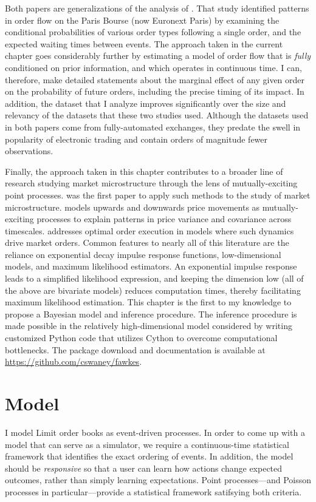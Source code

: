 		Both papers are generalizations of the analysis of \cite{Biais1995}. That study identified patterns in order flow on the Paris Bourse (now Euronext Paris) by examining the conditional probabilities of various order types following a single order, and the expected waiting times between events. The approach taken in the current chapter goes considerably further by estimating a model of order flow that is \textit{fully} conditioned on prior information, and which operates in continuous time. I can, therefore, make detailed statements about the marginal effect of any given order on the probability of future orders, including the precise timing of its impact. In addition, the dataset that I analyze improves significantly over the size and relevancy of the datasets that these two studies used. Although the datasets used in both papers come from fully-automated exchanges, they predate the swell in popularity of electronic trading and contain orders of magnitude fewer observations.

		Finally, the approach taken in this chapter contributes to a broader line of research studying market microstructure through the lens of mutually-exciting point processes. \cite{Bowsher2007} was the first paper to apply such methods to the study of market microstructure. \cite{Bacry2013} models upwards and downwards price movements as mutually-exciting processes to explain patterns in price variance and covariance across timescales. \cite{Alfonsi2016} addresses optimal order execution in models where such dynamics drive market orders. Common features to nearly all of this literature are the reliance on exponential decay impulse response functions, low-dimensional models, and maximum likelihood estimators. An exponential impulse response leads to a simplified likelihood expression, and keeping the dimension low (all of the above are bivariate models) reduces computation times, thereby facilitating maximum likelihood estimation. This chapter is the first to my knowledge to propose a Bayesian model and inference procedure. The inference procedure is made possible in the relatively high-dimensional model considered by writing customized Python code that utilizes Cython to overcome computational bottlenecks. The package download and documentation is available at \url{https://github.com/cswaney/fawkes}.


\section{Model}
	I model Limit order books as event-driven processes. In order to come up with a model that can serve as a simulator, we require a continuous-time statistical framework that identifies the exact ordering of events. In addition, the model should be \textit{responsive} so that a user can learn how actions change expected outcomes, rather than simply learning expectations. Point processes---and Poisson processes in particular---provide a statistical framework satifsying both criteria.


